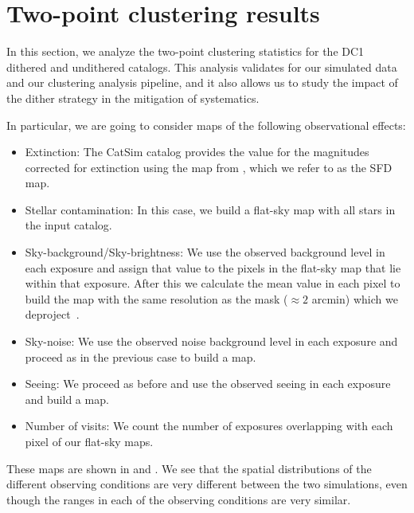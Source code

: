 \documentclass[\docopts]{\docclass}
\begin{document}
\section{Two-point clustering results}
\label{sec:results}

In this section, we analyze the two-point clustering statistics for the DC1 dithered and undithered catalogs. This analysis validates for our simulated data and our clustering analysis pipeline, and it also allows us to study the impact of the dither strategy in the mitigation of systematics.

In particular, we are going to consider maps of the following observational effects:
\begin{itemize}
\item Extinction: The CatSim catalog provides the value for the magnitudes corrected for extinction using the map from \citet{1998ApJ...500..525S}, which we refer to as the SFD map.
\item Stellar contamination: In this case, we build a flat-sky map with all stars in the input catalog.
\item Sky-background/Sky-brightness: We use the observed background level in each exposure and assign that value to the pixels in the flat-sky map that lie within that exposure. After this we calculate the mean value in each pixel to build the map with the same resolution as the mask ($\approx 2$ arcmin) which we deproject~\citep{2019MNRAS.484.4127A}. 
\item Sky-noise: We use the observed noise background level in each exposure and proceed as in the previous case to build a map.
\item Seeing: We proceed as before and use the observed seeing in each exposure and build a map.
\item Number of visits: We count the number of exposures overlapping with each pixel of our flat-sky maps.
\end{itemize}
These maps are shown in  and . We see that the spatial distributions of the different observing conditions are very different between the two simulations, even though the ranges in each of the observing conditions are very similar. 
\end{document}
